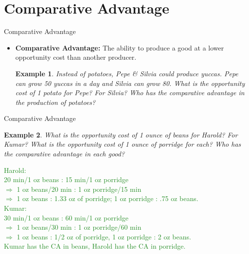 \documentclass[xcolor={dvipsnames},pdf, hyperref={colorlinks=true, citecolor=ForestGreen, linkcolor=BlueViolet, urlcolor=Magenta}]{beamer}
\newtheorem{exmp}{Example}[section]
\theoremstyle{definition}
\newcommand{\defn}[1]{\textbf{#1}}
\newcommand{\ddp}[1]{{\textcolor{ForestGreen}{#1}}}
\begin{document}
\section{Comparative Advantage}


\begin{frame}{Comparative Advantage}
	\begin{itemize}
		\item 	\defn{Comparative Advantage:} The ability to produce a good at a lower opportunity cost than another producer.
		
		\begin{exmp}
			Instead of potatoes, Pepe \& Silvia could produce yuccas. Pepe can grow 50 yuccas in a day and Silvia can grow 80. What is the opportunity cost of 1 potato for Pepe? For Silvia? Who has the comparative advantage in the production of potatoes?
		
		\end{exmp} 
		
	\pause 	\ddp{Pepe: 25 P : 50 Y $\Rightarrow$ 1 P : 2 Y; 1 Y : 1/2 P.\\
			Silvia: 20 P : 80 Y $\Rightarrow$ 1 P : 4 Y; 1 Y : 1/4 P. \\
			Pepe has the CA in potatoes, Silvia has the CA in yuccas.}
	\end{itemize}
	\end{frame}
	
\begin{frame}[t]{Comparative Advantage}
		\begin{exmp}
			What is the opportunity cost of 1 ounce of beans for Harold? For Kumar? What is the opportunity cost of 1 ounce of porridge for each? Who has the comparative advantage in each good?
		\end{exmp} 
		\ddp{\pause Harold: \\
		20 min/1 oz beans : 15 min/1 oz porridge \\
		\pause $\Rightarrow$ 1 oz beans/20 min : 1 oz porridge/15 min \\
		\pause $\Rightarrow$ 1 oz beans : 1.33 oz of porridge; 1 oz porridge : .75 oz beans. \\ 
		\pause Kumar: \\
		30 min/1 oz beans : 60 min/1 oz porridge \\
		 \pause $\Rightarrow$ 1 oz beans/30 min : 1 oz porridge/60 min \\
		 \pause $\Rightarrow$ 1 oz beans : 1/2 oz of porridge, 1 oz porridge : 2 oz beans. \\
		\pause	Kumar has the CA in beans, Harold has the CA in porridge.}
\end{frame}
	
\end{document}
